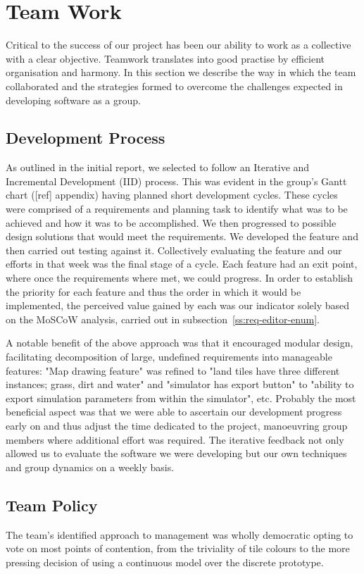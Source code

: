 \section{Team Work}
\label{sec:team_work}
Critical to the success of our project has been our ability to work as a collective with a clear objective. Teamwork translates into good practise by efficient organisation and harmony. In this section we describe the way in which the team collaborated and the strategies formed to overcome the challenges expected in developing software as a group.

\subsection{Development Process}\label{ss:dev-process}
As outlined in the initial report, we selected to follow an Iterative and Incremental Development (IID) process. This was evident in the group's Gantt chart ([ref] appendix) having planned short development cycles. These cycles were comprised of a requirements and planning task to identify what was to be achieved and how it was to be accomplished. We then progressed to possible design solutions that would meet the requirements. We developed the feature and then carried out testing against it. Collectively evaluating the feature and our efforts in that week was the final stage of a cycle. Each feature had an exit point, where once the requirements where met, we could progress. In order to establish the priority for each feature and thus the order in which it would be implemented, the perceived value gained by each was our indicator solely based on the MoSCoW analysis, carried out in subsection~\ref{ss:req-editor-enum}.

A notable benefit of the above approach was that it encouraged modular design, facilitating decomposition of large, undefined requirements into manageable features: "Map drawing feature" was refined to "land tiles have three different instances; grass, dirt and water" and "simulator has export button" to "ability to export simulation parameters from within the simulator", etc.  
Probably the most beneficial aspect was that we were able to ascertain our development progress early on and thus adjust the time dedicated to the project, manoeuvring group members where additional effort was required. The iterative feedback not only allowed us to evaluate the software we were developing but our own techniques and group dynamics on a weekly basis.

\subsection{Team Policy}
The team's identified approach to management was wholly democratic opting to vote on most points of contention, from the triviality of tile colours to the more pressing decision of using a continuous model over the discrete prototype.

